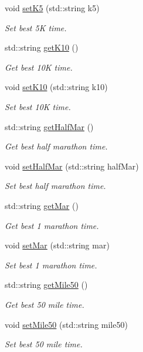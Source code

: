 \begin{DoxyCompactItemize}
void \mbox{\hyperlink{classAthleteDataContainer_acb7385bd747212344e540504a3ff8fd2}{set\+K5}} (std\+::string k5)
\begin{DoxyCompactList}\small\item\em Set best 5K time. \end{DoxyCompactList}\item 
std\+::string \mbox{\hyperlink{classAthleteDataContainer_a180284120d3d0a07963df6dfe031d099}{get\+K10}} ()
\begin{DoxyCompactList}\small\item\em Get best 10K time. \end{DoxyCompactList}\item 
void \mbox{\hyperlink{classAthleteDataContainer_ad85c342fa362849ec7e1bfce00a6eedc}{set\+K10}} (std\+::string k10)
\begin{DoxyCompactList}\small\item\em Set best 10K time. \end{DoxyCompactList}\item 
std\+::string \mbox{\hyperlink{classAthleteDataContainer_afd68484bbb9ab67aadadcabccb39e498}{get\+Half\+Mar}} ()
\begin{DoxyCompactList}\small\item\em Get best half marathon time. \end{DoxyCompactList}\item 
void \mbox{\hyperlink{classAthleteDataContainer_ac18102b6a3f969b6fc79fbe0fc2dc03f}{set\+Half\+Mar}} (std\+::string half\+Mar)
\begin{DoxyCompactList}\small\item\em Set best half marathon time. \end{DoxyCompactList}\item 
std\+::string \mbox{\hyperlink{classAthleteDataContainer_af850c53098bf3b2977274332a22ab52e}{get\+Mar}} ()
\begin{DoxyCompactList}\small\item\em Get best 1 marathon time. \end{DoxyCompactList}\item 
void \mbox{\hyperlink{classAthleteDataContainer_aaac0e27d4a706b540a2f63b63e3640e2}{set\+Mar}} (std\+::string mar)
\begin{DoxyCompactList}\small\item\em Set best 1 marathon time. \end{DoxyCompactList}\item 
std\+::string \mbox{\hyperlink{classAthleteDataContainer_ac80fd37eff39d59c11cc0b6fb5e07423}{get\+Mile50}} ()
\begin{DoxyCompactList}\small\item\em Get best 50 mile time. \end{DoxyCompactList}\item 
void \mbox{\hyperlink{classAthleteDataContainer_a3b2b888cc08f72178978d171e20212bc}{set\+Mile50}} (std\+::string mile50)
\begin{DoxyCompactList}\small\item\em Set best 50 mile time. \end{DoxyCompactList}\end{DoxyCompactItemize}


